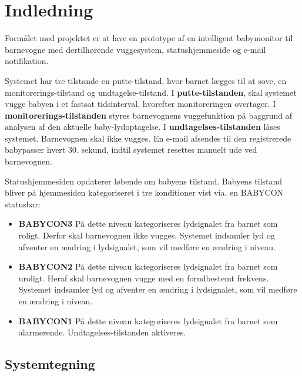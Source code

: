 \section{Indledning}

Formålet med projektet er at lave en prototype af en intelligent babymonitor til barnevogne med dertilhørende vuggesystem, statushjemmeside og e-mail notifikation.

Systemet har tre tilstande en putte-tilstand, hvor barnet lægges til at sove, en monitorerings-tilstand og undtagelse-tilstand.
I \textbf{putte-tilstanden}, skal systemet vugge babyen i et fastsat tidsinterval, hvorefter monitoreringen overtager.
I \textbf{monitorerings-tilstanden} styres barnevognens vuggefunktion på baggrund af analysen af den aktuelle baby-lydoptagelse.
I \textbf{undtagelses-tilstanden} låses systemet. Barnevognen skal ikke vugges. En e-mail afsendes til den registrerede babypasser hvert 30. sekund, indtil systemet resettes manuelt ude ved barnevognen. 

Statushjemmesiden opdaterer løbende om babyens tilstand. Babyens tilstand bliver på hjemmesiden kategoriseret i tre konditioner vist via. en BABYCON statusbar:

\begin{itemize}
\item \textbf{BABYCON3} 
\newline På dette niveau kategoriseres lydsignalet fra barnet som roligt. Derfor skal barnevognen ikke vugges. Systemet indsamler lyd og afventer en ændring i lydsignalet, som vil medføre en ændring i niveau. 

\item \textbf{BABYCON2}
\newline På dette niveau kategoriseres lydsignalet fra barnet som uroligt. Heraf skal barnevognen vugge med en forudbestemt frekvens. Systemet indsamler lyd og afventer en ændring i lydsignalet, som vil medføre en ændring i niveau. 

\item \textbf{BABYCON1}
\newline På dette niveau kategoriseres lydsignalet fra barnet som alarmerende. Undtagelses-tilstanden aktiveres. 
\end{itemize}
 
\subsection*{Systemtegning}

